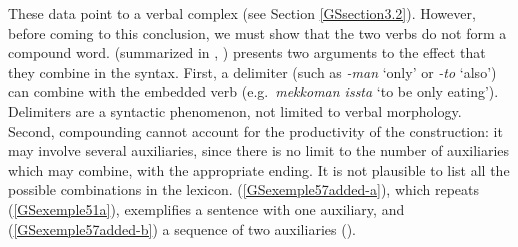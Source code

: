 {%
%

\eal
	\label{GSexemple56} 
	\label{GSexemple56a}

    \label{GSexemple56b}
\zl

These data point to a verbal complex (see Section \ref{GSsection3.2}). However, before coming to this conclusion, we must show that the two verbs do not form a compound word. \cite{no1991case} (summarized in \citealt{Chung98a-u}, \citealt{Kim2016a-u}) presents two arguments to the effect that they combine in the syntax. First, a delimiter (such as \emph{-man} `only' or \emph{-to} `also') can combine with the embedded verb (e.g.\ \emph{mekkoman issta} `to be only eating'). Delimiters are a syntactic phenomenon, not limited to verbal morphology. 
Second, compounding cannot account for the productivity of the construction: it may involve several auxiliaries, since there is no limit to the number of auxiliaries which may combine, with the appropriate ending. It is not plausible to list all the possible combinations in the lexicon. (\ref{GSexemple57added-a}), which repeats (\ref{GSexemple51a}), exemplifies a sentence with one auxiliary, and (\ref{GSexemple57added-b}) a sequence of two auxiliaries (\citealt[172]{Chung98a-u}).

}
